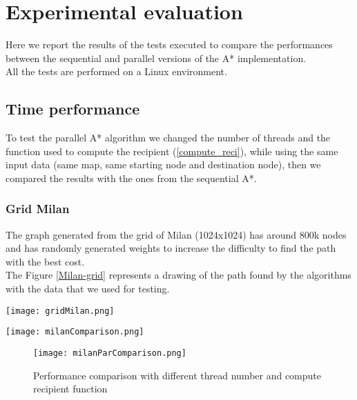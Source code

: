 \section{Experimental evaluation}
\label{Sec:experimental-eval}

Here we report the results of the tests executed to compare the performances between the sequential and parallel versions of the A* implementation.
\\
All the tests are performed on a Linux environment.

\subsection{Time performance}

To test the parallel A* algorithm we changed the number of threads and the function used to compute the recipient (\ref{compute_reci}), while using the same input data (same map, same starting node and destination node),
then we compared the results with the ones from the sequential A*. 

\subsubsection{Grid Milan}
The graph generated from the grid of Milan (1024x1024) has around 800k nodes and has randomly generated weights to increase the difficulty to find the path with the best cost.
\\
The Figure \ref{Milan-grid} represents a drawing of the path found by the algorithms with the data that we used for testing.

\begin{center} 
    \begin{minipage}[b]{0.3\textwidth}
        \centering
        \texttt{[image: gridMilan.png]}
        \label{Milan-grid}
    \end{minipage}%
    \hspace{0.5cm}
    \begin{minipage}[b]{0.6\textwidth}
        \centering
        \texttt{[image: milanComparison.png]}
        \label{Milan-comp}
    \end{minipage} 
\end{center}


\begin{figure}
    \centering
    \texttt{[image: milanParComparison.png]}
    \caption{Performance comparison with different thread number and compute recipient function}
    \label{Milan-par-comp}
\end{figure}


